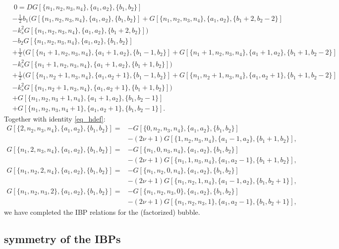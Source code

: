 \documentclass[a4paper,12pt]{article}
\newcommand{\FR}[2]{\displaystyle\frac{\,{#1}\,}{#2}}
\newcommand{\n}{\nonumber}
\begin{document}
\begin{align}
&~0 =  D G[\{n_1,n_2,n_3,n_4\},\{a_1,a_2\},\{b_1,b_2\}]\n\\
&- \FR12 b_1\Big(G[\{n_1,n_2,n_3,n_4\},\{a_1,a_2\},\{b_1,b_2\}] + G[\{n_1,n_2,n_3,n_4\},\{a_1,a_2\},\{b_1+2,b_2-2\}]\n\\
&-k_s^2 G[\{n_1,n_2,n_3,n_4\},\{a_1,a_2\},\{b_1+2,b_2\}] 
\Big)\n\\
& - b_2  G[\{n_1,n_2,n_3,n_4\},\{a_1,a_2\},\{b_1,b_2\}]\n\\
&+\FR12\Big( G[\{n_1+1,n_2,n_3,n_4\},\{a_1+1,a_2\},\{b_1-1,b_2\}] + G[\{n_1+1,n_2,n_3,n_4\},\{a_1+1,a_2\},\{b_1+1,b_2-2\}]\n\\
& -k_s^2 G[\{n_1+1,n_2,n_3,n_4\},\{a_1+1,a_2\},\{b_1+1,b_2\}] \Big)\n\\
&+\FR12\Big( G[\{n_1,n_2+1,n_3,n_4\},\{a_1,a_2+1\},\{b_1-1,b_2\}] + G[\{n_1,n_2+1,n_3,n_4\},\{a_1,a_2+1\},\{b_1+1,b_2-2\}]\n\\
& -k_s^2 G[\{n_1,n_2+1,n_3,n_4\},\{a_1,a_2+1\},\{b_1+1,b_2\}] \Big)\n\\
&+G[\{n_1,n_2,n_3+1,n_4\},\{a_1+1,a_2\},\{b_1,b_2-1\}]\n\\
& + G[\{n_1,n_2,n_3,n_4+1\},\{a_1,a_2+1\},\{b_1,b_2-1\}].
\end{align}
Together with identity \eqref{eq_hdef}:
\begin{align}
G[\{2,n_2,n_3,n_4\},\{a_1,a_2\},\{b_1,b_2\}] =& - G[\{0,n_2,n_3,n_4\},\{a_1,a_2\},\{b_1,b_2\}]\n\\
& - (2\nu+1) G[\{1,n_2,n_3,n_4\},\{a_1-1,a_2\},\{b_1+1,b_2\}],\\
G[\{n_1,2,n_3,n_4\},\{a_1,a_2\},\{b_1,b_2\}] =& - G[\{n_1,0,n_3,n_4\},\{a_1,a_2\},\{b_1,b_2\}]\n\\
& - (2\nu+1) G[\{n_1,1,n_3,n_4\},\{a_1,a_2-1\},\{b_1+1,b_2\}],\\
G[\{n_1,n_2,2,n_4\},\{a_1,a_2\},\{b_1,b_2\}] =& - G[\{n_1,n_2,0,n_4\},\{a_1,a_2\},\{b_1,b_2\}]\n\\
& - (2\nu+1) G[\{n_1,n_2,1,n_4\},\{a_1-1,a_2\},\{b_1,b_2+1\}],\\
G[\{n_1,n_2,n_3,2\},\{a_1,a_2\},\{b_1,b_2\}] =& - G[\{n_1,n_2,n_3,0\},\{a_1,a_2\},\{b_1,b_2\}]\n\\
& - (2\nu+1) G[\{n_1,n_2,n_3,1\},\{a_1,a_2-1\},\{b_1,b_2+1\}],
\end{align}
we have completed the IBP relations for the (factorized) bubble.

\subsection{symmetry of the IBPs}
\end{document}
